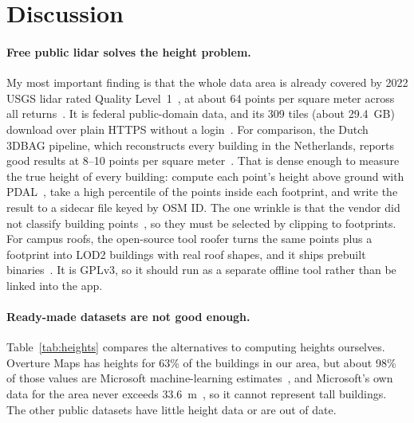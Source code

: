 \documentclass[11pt,letterpaper]{article}
\begin{document}
\section*{Discussion}

\paragraph{Free public lidar solves the height problem.} My most important finding is that the whole data area is already covered by 2022 USGS lidar rated Quality Level~1~\cite{threedep}, at about 64 points per square meter across all returns~\cite{opentopo}. It is federal public-domain data, and its 309 tiles (about 29.4~GB) download over plain HTTPS without a login~\cite{tnmlidar}. For comparison, the Dutch 3DBAG pipeline, which reconstructs every building in the Netherlands, reports good results at 8--10 points per square meter~\cite{geoflow}. That is dense enough to measure the true height of every building: compute each point's height above ground with PDAL~\cite{pdalhag}, take a high percentile of the points inside each footprint, and write the result to a sidecar file keyed by OSM ID. The one wrinkle is that the vendor did not classify building points~\cite{woolpert}, so they must be selected by clipping to footprints. For campus roofs, the open-source tool roofer turns the same points plus a footprint into LOD2 buildings with real roof shapes, and it ships prebuilt binaries~\cite{roofer}. It is GPLv3, so it should run as a separate offline tool rather than be linked into the app.

\paragraph{Ready-made datasets are not good enough.} Table~\ref{tab:heights} compares the alternatives to computing heights ourselves. Overture Maps has heights for 63\% of the buildings in our area, but about 98\% of those values are Microsoft machine-learning estimates~\cite{overture}, and Microsoft's own data for the area never exceeds 33.6~m~\cite{msbuildings}, so it cannot represent tall buildings. The other public datasets have little height data or are out of date.
\end{document}

